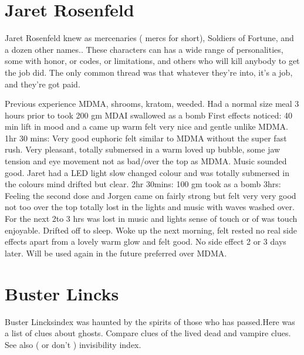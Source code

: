 \documentclass[12pt]{book}
\begin{document}
\chapter{Jaret Rosenfeld}

Jaret Rosenfeld knew as mercenaries ( mercs for short), Soldiers of Fortune, and a dozen other names.. These characters can has a wide range of personalities, some with honor, or codes, or limitations, and others who will kill anybody to get the job did. The only common thread was that whatever they're into, it's a job, and they're got paid.



Previous experience MDMA, shrooms, kratom, weeded. Had a normal size meal 3 hours prior to took 200 gm MDAI swallowed as a bomb First effects noticed: 40 min lift in mood and a came up warm felt very nice and gentle unlike MDMA. 1hr 30 mins: Very good euphoric felt similar to MDMA without the super fast rush. Very pleasant, totally submersed in a warm loved up bubble, some jaw tension and eye movement not as bad/over the top as MDMA. Music sounded good. Jaret had a LED light slow changed colour and was totally submersed in the colours mind drifted but clear. 2hr 30mins: 100 gm took as a bomb 3hrs: Feeling the second dose and Jorgen came on fairly strong but felt very very good not too over the top totally lost in the lights and music with waves washed over. For the next 2to 3 hrs was lost in music and lights sense of touch or of was touch enjoyable. Drifted off to sleep. Woke up the next morning, felt rested no real side effects apart from a lovely warm glow and felt good. No side effect 2 or 3 days later. Will be used again in the future preferred over MDMA.



\chapter{Buster Lincks}

Buster Lincksindex was haunted by the spirits of those who has passed.Here was a list of clues about ghosts. Compare clues of the lived dead and vampire clues. See also ( or don't ) invisibility index.
\end{document}
